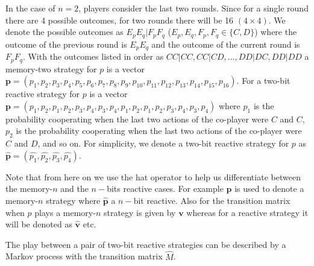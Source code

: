 \documentclass{article}
\theoremstyle{definition}
\begin{document}
In the case of \(n=2\), players consider the last two rounds. Since for a single
round there are 4 possible outcomes, for two rounds there will be 16 \((4 \times
4)\). We denote the possible outcomes as \(E_p E_q | F_p F_q\) (\(E_p, E_q, F_p,
F_q \in \{C, D\}\)) where the outcome of the previous round is \(E_p E_q\) and
the outcome of the current round is \(F_p F_q\). With the outcomes listed in
order as \(CC|CC, CC|CD, \dots, DD|DC, DD|DD\) a memory-two strategy for \(p\) is a
vector \(\mathbf{p} = (p_1, p_2, p_3, p_4, p_5, p_6, p_7, p_8, p_9, p_{10},
p_{11}, p_{12}, p_{13}, p_{14}, \allowbreak p_{15}, p_{16})\). For a two-bit
reactive strategy for \(p\) is a vector \(\mathbf{p} = (p_1, p_2, p_1, p_2, p_3,
p_4, p_3, p_4, p_1, p_2, p_1, p_2, p_3, p_4, \allowbreak p_3, p_4)\) where
\(p_1\) is the probability cooperating when the last two actions of the
co-player were \(C\) and \(C\), \(p_2\) is the probability cooperating when the
last two actions of the co-player were \(C\) and \(D\), and so on. For
simplicity, we denote a two-bit reactive strategy for \(p\) as
\(\mathbf{\hat{p}} = (\hat{p_1}, \hat{p_2}, \hat{p_3}, \hat{p_4})\).

Note that from here on we use the hat operator to help us differentiate between
the memory-\(n\) and the \(n-\)bits reactive cases. For example \(\mathbf{p}\)
is used to denote a memory-\(n\) strategy where \(\mathbf{\hat{p}}\) a \(n-\)bit
reactive. Also for the transition matrix when \(p\) plays a memory-\(n\)
strategy is given by \(\mathbf{v}\) whereas for a reactive strategy it will be
denoted as \(\mathbf{\hat{v}}\) etc.

The play between a pair of two-bit reactive strategies can be described by a Markov
process with the transition matrix \(\hat{M}\).
\end{document}
